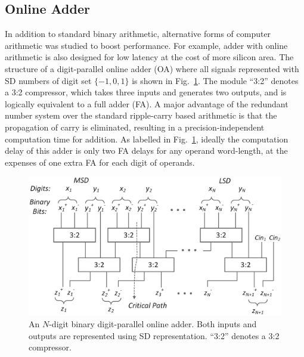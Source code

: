 \documentclass[10pt, conference, compsocconf]{IEEEtran}
\begin{document}
\subsection{Online Adder}\label{subsec:online_adder}
In addition to standard binary arithmetic, alternative forms of computer arithmetic was studied to boost performance. For example, adder with online arithmetic is also designed for low latency at the cost of more silicon area. The structure of a digit-parallel online adder (OA) where all signals represented with SD numbers of digit set $\{-1,0,1\}$ is shown in Fig.~\ref{Fig:Radix2SD_adder}. The module ``3:2'' denotes a 3:2 compressor, which takes three inputs and generates two outputs, and is logically equivalent to a full adder (FA). A major advantage of the redundant number system over the standard ripple-carry based arithmetic is that the propagation of carry is eliminated, resulting in a precision-independent computation time for addition. As labelled in Fig.~\ref{Fig:Radix2SD_adder}, ideally the computation delay of this adder is only two FA delays for any operand word-length, at the expenses of one extra FA for each digit of operands. 
%
\begin{figure}[tbp]
  \centering
  \includegraphics[width=.45\textwidth]{./figures/SDAdder.eps}
  \caption{An $N$-digit binary digit-parallel online adder. Both inputs and outputs are represented using SD representation. ``3:2'' denotes a 3:2 compressor.}
  \label{Fig:Radix2SD_adder}
\end{figure}
\end{document}
